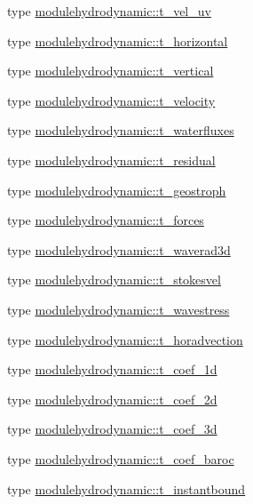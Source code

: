 \begin{DoxyCompactItemize}
type \mbox{\hyperlink{structmodulehydrodynamic_1_1t__vel__uv}{modulehydrodynamic\+::t\+\_\+vel\+\_\+uv}}
\item 
type \mbox{\hyperlink{structmodulehydrodynamic_1_1t__horizontal}{modulehydrodynamic\+::t\+\_\+horizontal}}
\item 
type \mbox{\hyperlink{structmodulehydrodynamic_1_1t__vertical}{modulehydrodynamic\+::t\+\_\+vertical}}
\item 
type \mbox{\hyperlink{structmodulehydrodynamic_1_1t__velocity}{modulehydrodynamic\+::t\+\_\+velocity}}
\item 
type \mbox{\hyperlink{structmodulehydrodynamic_1_1t__waterfluxes}{modulehydrodynamic\+::t\+\_\+waterfluxes}}
\item 
type \mbox{\hyperlink{structmodulehydrodynamic_1_1t__residual}{modulehydrodynamic\+::t\+\_\+residual}}
\item 
type \mbox{\hyperlink{structmodulehydrodynamic_1_1t__geostroph}{modulehydrodynamic\+::t\+\_\+geostroph}}
\item 
type \mbox{\hyperlink{structmodulehydrodynamic_1_1t__forces}{modulehydrodynamic\+::t\+\_\+forces}}
\item 
type \mbox{\hyperlink{structmodulehydrodynamic_1_1t__waverad3d}{modulehydrodynamic\+::t\+\_\+waverad3d}}
\item 
type \mbox{\hyperlink{structmodulehydrodynamic_1_1t__stokesvel}{modulehydrodynamic\+::t\+\_\+stokesvel}}
\item 
type \mbox{\hyperlink{structmodulehydrodynamic_1_1t__wavestress}{modulehydrodynamic\+::t\+\_\+wavestress}}
\item 
type \mbox{\hyperlink{structmodulehydrodynamic_1_1t__horadvection}{modulehydrodynamic\+::t\+\_\+horadvection}}
\item 
type \mbox{\hyperlink{structmodulehydrodynamic_1_1t__coef__1d}{modulehydrodynamic\+::t\+\_\+coef\+\_\+1d}}
\item 
type \mbox{\hyperlink{structmodulehydrodynamic_1_1t__coef__2d}{modulehydrodynamic\+::t\+\_\+coef\+\_\+2d}}
\item 
type \mbox{\hyperlink{structmodulehydrodynamic_1_1t__coef__3d}{modulehydrodynamic\+::t\+\_\+coef\+\_\+3d}}
\item 
type \mbox{\hyperlink{structmodulehydrodynamic_1_1t__coef__baroc}{modulehydrodynamic\+::t\+\_\+coef\+\_\+baroc}}
\item 
type \mbox{\hyperlink{structmodulehydrodynamic_1_1t__instantbound}{modulehydrodynamic\+::t\+\_\+instantbound}}
\item 

\end{DoxyCompactItemize}
